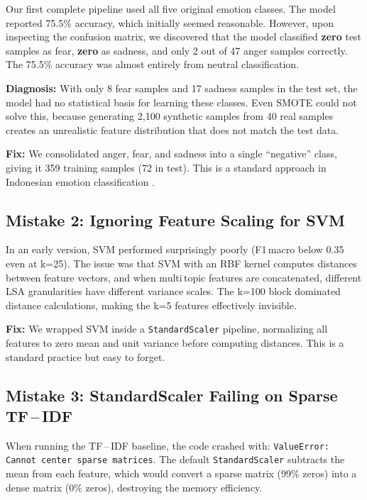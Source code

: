\documentclass[12pt,a4paper,twoside]{article}
\theoremstyle{definition}
\begin{document}
Our first complete pipeline used all five original emotion classes. The model reported 75.5\% accuracy, which initially seemed reasonable. However, upon inspecting the confusion matrix, we discovered that the model classified \textbf{zero} test samples as fear, \textbf{zero} as sadness, and only 2 out of 47 anger samples correctly. The 75.5\% accuracy was almost entirely from neutral classification.

\textbf{Diagnosis:} With only 8 fear samples and 17 sadness samples in the test set, the model had no statistical basis for learning these classes. Even SMOTE could not solve this, because generating 2{,}100 synthetic samples from 40 real samples creates an unrealistic feature distribution that does not match the test data.

\textbf{Fix:} We consolidated anger, fear, and sadness into a single ``negative'' class, giving it 359 training samples (72 in test). This is a standard approach in Indonesian emotion classification \citep{saputri2018emotion}.

\subsection{Mistake 2: Ignoring Feature Scaling for SVM}

In an early version, SVM performed surprisingly poorly (F1\,macro below 0.35 even at k=25). The issue was that SVM with an RBF kernel computes distances between feature vectors, and when multi\,topic features are concatenated, different LSA granularities have different variance scales. The k=100 block dominated distance calculations, making the k=5 features effectively invisible.

\textbf{Fix:} We wrapped SVM inside a \texttt{StandardScaler} pipeline, normalizing all features to zero mean and unit variance before computing distances. This is a standard practice but easy to forget.

\subsection{Mistake 3: StandardScaler Failing on Sparse TF\,--\,IDF}

When running the TF\,--\,IDF baseline, the code crashed with: \texttt{ValueError: Cannot center sparse matrices}. The default \texttt{StandardScaler} subtracts the mean from each feature, which would convert a sparse matrix (99\% zeros) into a dense matrix (0\% zeros), destroying the memory efficiency.
\end{document}

